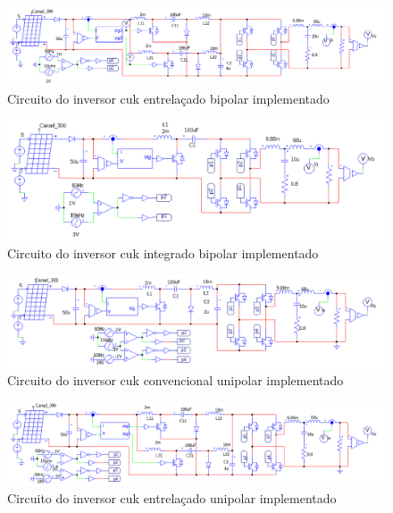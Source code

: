 \documentclass[
	12pt,				%
	openright,			%
	twoside,			%
	a4paper,			%
	english,			%
	french,				%
	spanish,			%
	brazil,				%
	]{abntex2}
\begin{document}
\begin{anexosenv}
\begin{figure}
	\end{figure}

	\begin{figure}
		\centering
		\includegraphics[width=\linewidth]{comp_interv_circ_clean}
		\caption{Circuito do inversor cuk entrelaçado bipolar implementado}	
	\end{figure}

	\begin{figure}
		\centering
		\includegraphics[width=\linewidth]{comp_integ_circ_clean}
		\caption{Circuito do inversor cuk integrado bipolar implementado}	
	\end{figure}


	\begin{figure}
		\centering
		\includegraphics[width=\linewidth]{comp_conv_circ_clean_unip}
		\caption{Circuito do inversor cuk convencional unipolar implementado}
	\end{figure}

	\begin{figure}
		\centering
		\includegraphics[width=\linewidth]{comp_interv_circ_clean_unip}
		\caption{Circuito do inversor cuk entrelaçado unipolar implementado}	
	\end{figure}


\end{anexosenv}
\end{document}
